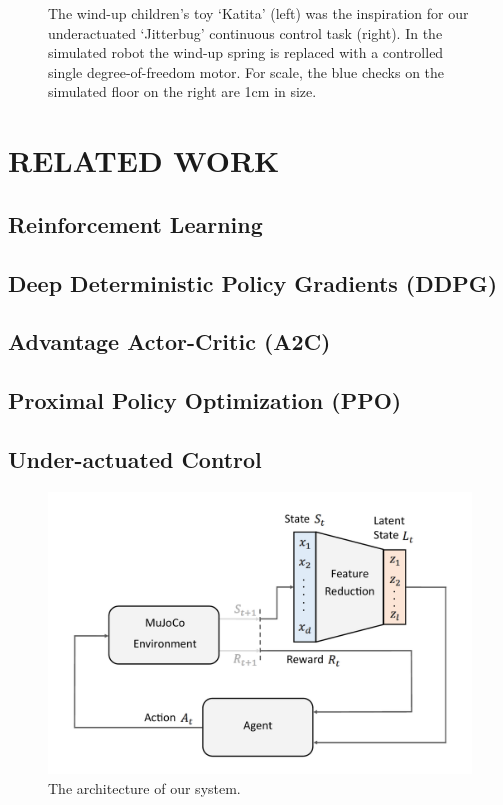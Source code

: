 \documentclass[letterpaper, 10 pt, conference]{ieeeconf}
\begin{document}
\begin{figure}[ht]
    \caption{
        The wind-up children's toy `Katita' (left) was the inspiration for our underactuated `Jitterbug' continuous control task (right).
        In the simulated robot the wind-up spring is replaced with a controlled single degree-of-freedom motor.
        For scale, the blue checks on the simulated floor on the right are 1cm in size.
    }
    \label{fig:leader}
    
\end{figure}

\lipsum[1-4]

\section{RELATED WORK}

\subsection{Reinforcement Learning}

\subsection{Deep Deterministic Policy Gradients (DDPG)}

\subsection{Advantage Actor-Critic (A2C)}

\subsection{Proximal Policy Optimization (PPO)}

\subsection{Under-actuated Control}

\lipsum[1-2]

\begin{figure}[ht]
    \centering
    \includegraphics[width=\linewidth]{fig-system-arch}
    \caption{
        The architecture of our system.
    }
    \label{fig:system-arch}
\end{figure}
\end{document}
